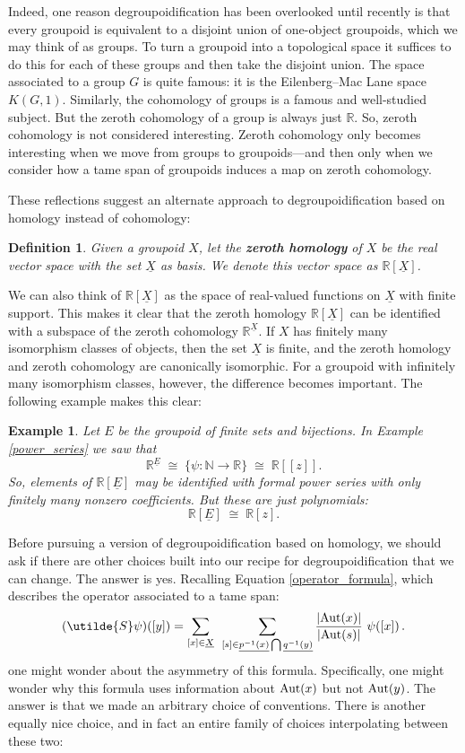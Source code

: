 \documentclass{article}
\renewcommand{\to}{\rightarrow}
\newcommand{\maps}{\colon}
\newcommand{\iso}{\cong}
\newcommand{\R}{{\mathbb R}}
\newcommand{\N}{{\mathbb N}}
\newcommand{\Aut}{{\rm Aut}}
\renewcommand{\u}[1]{\underline{#1}}
\newtheorem{definition}[thm]{Definition}
\newtheorem{example}[thm]{Example}
\begin{document}
Indeed, one reason degroupoidification has been overlooked until
recently is that every groupoid is equivalent to a disjoint union of
one-object groupoids, which we may think of as groups.  To turn a
groupoid into a topological space it suffices to do this for each of
these groups and then take the disjoint union.  The space associated
to a group $G$ is quite famous: it is the Eilenberg--Mac Lane space
$K(G,1)$.  Similarly, the cohomology of groups is a famous and
well-studied subject.  But the zeroth cohomology of a group is always
just $\R$.  So, zeroth cohomology is not considered interesting.
Zeroth cohomology only becomes interesting when we move from groups to
groupoids---and then only when we consider how a tame span of
groupoids induces a map on zeroth cohomology.

These reflections suggest an alternate approach to degroupoidification
based on homology instead of cohomology:

\begin{definition} Given a groupoid $X$, let the {\bf zeroth homology} of 
$X$ be the real vector space with the set $\u{X}$ as basis.  
We denote this vector space as $\R[\u{X}]$.
\end{definition}

We can also think of $\R[\u{X}]$ as the space of real-valued
functions on $\u{X}$ with finite support.  This makes it clear
that the zeroth homology $\R[\u{X}]$ can be identified with a
subspace of the zeroth cohomology $\R^{\u{X}}$.  If $X$ has
finitely many isomorphism classes of objects, then the set
$\u{X}$ is finite, and the zeroth homology and zeroth
cohomology are canonically isomorphic.  For a groupoid with infinitely
many isomorphism classes, however, the difference becomes important.
The following example makes this clear:
\begin{example}
\label{polynomials}
\textup{
Let $E$ be the groupoid of finite sets and bijections. 
In Example \ref{power_series} we saw that
\[ \R^{\u{E}} \; \iso \; \lbrace \psi \maps \N \to \R \rbrace 
\; \cong \; \R[[z]] . \]
So, elements of $\R[\u{E}]$ may be identified with 
formal power series with only finitely many nonzero coefficients.
But these are just polynomials:
\[   \R[\u{E}] \; \cong \; \R[z]  .\]
}
\end{example}

Before pursuing a version of degroupoidification based on homology, we
should ask if there are other choices built into our recipe for
degroupoidification that we can change. The answer is yes.  Recalling
Equation \ref{operator_formula}, which describes the operator associated
to a tame span:
\[   
(\utilde{S} \psi)([y]) = 
\sum_{[x] \in \u{X}} \;\,
\sum_{[s]\in\u{p^{-1}(x)}\bigcap \u{q^{-1}(y)}}
\frac{|\Aut(x)|}{|\Aut(s)|} \,\, \psi([x]) \,. 
\]
one might wonder about the asymmetry of this formula.  Specifically,
one might wonder why this formula uses information about $\Aut(x)$ but
not $\Aut(y)$. The answer is that we made an arbitrary choice of
conventions. There is another equally nice choice, and in fact 
an entire family of choices interpolating between these two:
\end{document}
